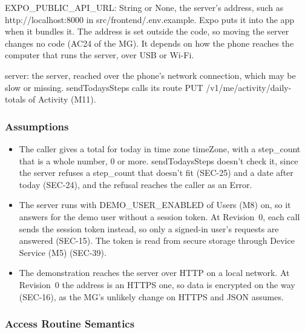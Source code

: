 \documentclass[12pt, titlepage]{article}
\begin{document}
{\raggedright
\noindent EXPO\_PUBLIC\_API\_URL: String or None, the server's address, such as
http://localhost:8000 in src/frontend/.env.example. Expo puts it into the app
when it bundles it. The address is set outside the code, so moving the server
changes no code (AC24 of the MG). It depends on how the phone reaches the
computer that runs the server, over USB or Wi-Fi.\par}

\medskip
\noindent server: the \progname{} server, reached over the phone's network
connection, which may be slow or missing. sendTodaysSteps calls its route
PUT /v1/me/activity/daily-totals of Activity (M11).

\subsubsection{Assumptions}

\begin{itemize}
\item The caller gives a total for today in time zone timeZone, with a
  step\_count that is a whole number, 0 or more. sendTodaysSteps doesn't check
  it, since the server refuses a step\_count that doesn't fit (SEC-25) and a
  date after today (SEC-24), and the refusal reaches the caller as an Error.
\item The server runs with DEMO\_USER\_ENABLED of Users (M8) on, so it answers
  for the demo user without a session token. At Revision~0, each call sends the
  session token instead, so only a signed-in user's requests are answered
  (SEC-15). The token is read from secure storage through Device Service (M5)
  (SEC-39).
\item The demonstration reaches the server over HTTP on a local network. At
  Revision~0 the address is an HTTPS one, so data is encrypted on the way
  (SEC-16), as the MG's unlikely change on HTTPS and JSON assumes.
\end{itemize}

\subsubsection{Access Routine Semantics}
\end{document}
